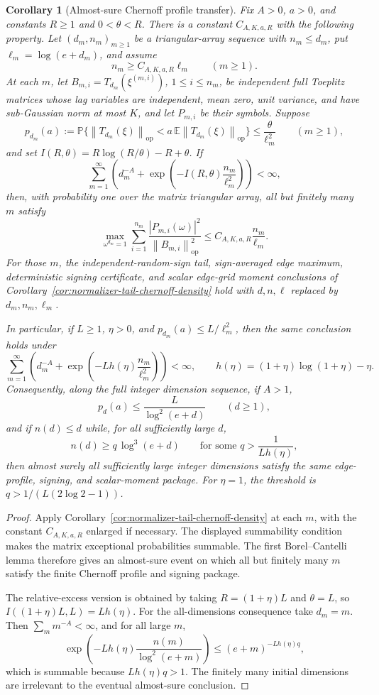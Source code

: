 \documentclass[11pt]{amsart}
\numberwithin{equation}{section}
\newtheorem{corollary}[theorem]{Corollary}
\theoremstyle{definition}
\theoremstyle{remark}
\newcommand{\op}{\mathrm{op}}
\newcommand{\Prob}{\mathbb P}
\newcommand{\Exp}{\mathbb E}
\newcommand{\norm}[1]{\left\lVert #1\right\rVert}
\newcommand{\abs}[1]{\left\lvert #1\right\rvert}
\begin{document}
\begin{corollary}[Almost-sure Chernoff profile transfer]
\label{cor:normalizer-tail-chernoff-borel-density}
Fix \(A>0\), \(a>0\), and constants \(R\ge1\) and \(0<\theta<R\).  There is a
constant \(C_{A,K,a,R}\) with the following property.  Let \((d_m,n_m)_{m\ge1}\)
be a triangular-array sequence with \(n_m\le d_m\), put
\(\ell_m=\log(e+d_m)\), and assume
\[
  n_m\ge C_{A,K,a,R}\ell_m \qquad(m\ge1).
\]
At each \(m\), let \(B_{m,i}=T_{d_m}(\xi^{(m,i)})\), \(1\le i\le n_m\), be
independent full Toeplitz matrices whose lag variables are independent, mean
zero, unit variance, and have sub-Gaussian norm at most \(K\), and let
\(P_{m,i}\) be their symbols.  Suppose
\[
  p_{d_m}(a):=
  \Prob\{\norm{T_{d_m}(\xi)}_{\op}
      <a\,\Exp\norm{T_{d_m}(\xi)}_{\op}\}
  \le \frac{\theta}{\ell_m^2}
  \qquad(m\ge1),
\]
and set \(I(R,\theta)=R\log(R/\theta)-R+\theta\).  If
\[
  \sum_{m=1}^\infty
  \left(d_m^{-A}+
  \exp\left(-I(R,\theta)\frac{n_m}{\ell_m^2}\right)\right)<\infty,
\]
then, with probability one over the matrix triangular array, all but finitely
many \(m\) satisfy
\[
  \max_{\omega^{d_m}=1}
  \sum_{i=1}^{n_m}
  \frac{\abs{P_{m,i}(\omega)}^2}{\norm{B_{m,i}}_{\op}^2}
  \le C_{A,K,a,R}\frac{n_m}{\ell_m}.
\]
For those \(m\), the independent-random-sign tail, sign-averaged edge maximum,
deterministic signing certificate, and scalar edge-grid moment conclusions of
Corollary~\ref{cor:normalizer-tail-chernoff-density} hold with
\(d,n,\ell\) replaced by \(d_m,n_m,\ell_m\).

In particular, if \(L\ge1\), \(\eta>0\), and
\(p_{d_m}(a)\le L/\ell_m^2\), then the same conclusion holds under
\[
  \sum_{m=1}^\infty
  \left(d_m^{-A}+
  \exp\left(-Lh(\eta)\frac{n_m}{\ell_m^2}\right)\right)<\infty,
  \qquad h(\eta)=(1+\eta)\log(1+\eta)-\eta .
\]
Consequently, along the full integer dimension sequence, if \(A>1\),
\[
  p_d(a)\le \frac{L}{\log^2(e+d)}
  \qquad(d\ge1),
\]
and if \(n(d)\le d\) while, for all sufficiently large \(d\),
\[
  n(d)\ge q\,\log^3(e+d)
  \qquad\text{for some } q>\frac1{Lh(\eta)},
\]
then almost surely all sufficiently large integer dimensions satisfy the same
edge-profile, signing, and scalar-moment package.  For \(\eta=1\), the threshold
is \(q>1/(L(2\log2-1))\).
\end{corollary}

\begin{proof}
Apply Corollary~\ref{cor:normalizer-tail-chernoff-density} at each \(m\), with
the constant \(C_{A,K,a,R}\) enlarged if necessary.  The displayed summability
condition makes the matrix exceptional probabilities summable.  The first
Borel--Cantelli lemma therefore gives an almost-sure event on which all but
finitely many \(m\) satisfy the finite Chernoff profile and signing package.

The relative-excess version is obtained by taking \(R=(1+\eta)L\) and
\(\theta=L\), so \(I((1+\eta)L,L)=Lh(\eta)\).  For the all-dimensions
consequence take \(d_m=m\).  Then \(\sum_m m^{-A}<\infty\), and for all large
\(m\),
\[
  \exp\left(-Lh(\eta)\frac{n(m)}{\log^2(e+m)}\right)
  \le (e+m)^{-Lh(\eta)q},
\]
which is summable because \(Lh(\eta)q>1\).  The finitely many initial dimensions
are irrelevant to the eventual almost-sure conclusion.
\end{proof}
\end{document}
